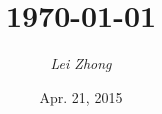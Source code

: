 \begin{frame}[fragile]
  	\maketitle
\end{frame}
%
\date{Apr. 21, 2015}
\author{\it Lei Zhong}
\title{\today \hspace{3.8cm} }
%
\begin{frame}{}
\tableofcontents
\end{frame}
